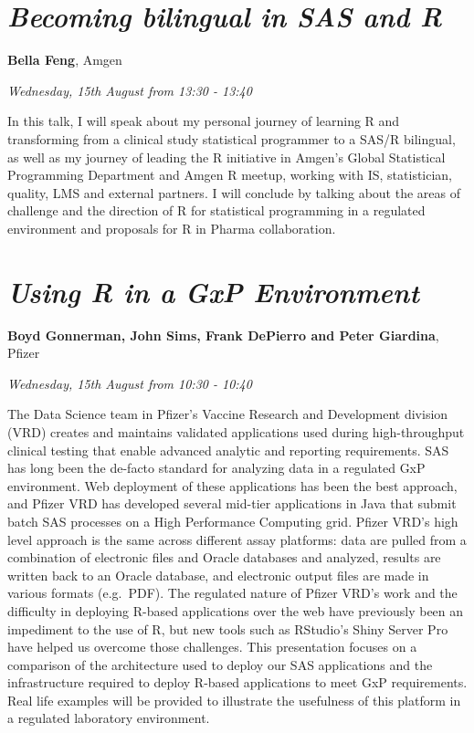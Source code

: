 \documentclass[]{book}
\theoremstyle{definition}
\theoremstyle{definition}
\theoremstyle{definition}
\theoremstyle{remark}
\begin{document}
\hypertarget{becoming-bilingual-in-sas-and-r}{%
\section{\texorpdfstring{\emph{Becoming bilingual in SAS and
R}}{Becoming bilingual in SAS and R}}\label{becoming-bilingual-in-sas-and-r}}

\textbf{Bella Feng}, Amgen

\emph{Wednesday, 15th August from 13:30 - 13:40}

In this talk, I will speak about my personal journey of learning R and
transforming from a clinical study statistical programmer to a SAS/R
bilingual, as well as my journey of leading the R initiative in Amgen's
Global Statistical Programming Department and Amgen R meetup, working
with IS, statistician, quality, LMS and external partners. I will
conclude by talking about the areas of challenge and the direction of R
for statistical programming in a regulated environment and proposals for
R in Pharma collaboration.

\hypertarget{using-r-in-a-gxp-environment}{%
\section{\texorpdfstring{\emph{Using R in a GxP
Environment}}{Using R in a GxP Environment}}\label{using-r-in-a-gxp-environment}}

\textbf{Boyd Gonnerman, John Sims, Frank DePierro and Peter Giardina},
Pfizer

\emph{Wednesday, 15th August from 10:30 - 10:40}

The Data Science team in Pfizer's Vaccine Research and Development
division (VRD) creates and maintains validated applications used during
high-throughput clinical testing that enable advanced analytic and
reporting requirements. SAS has long been the de-facto standard for
analyzing data in a regulated GxP environment. Web deployment of these
applications has been the best approach, and Pfizer VRD has developed
several mid-tier applications in Java that submit batch SAS processes on
a High Performance Computing grid. Pfizer VRD's high level approach is
the same across different assay platforms: data are pulled from a
combination of electronic files and Oracle databases and analyzed,
results are written back to an Oracle database, and electronic output
files are made in various formats (e.g.~PDF). The regulated nature of
Pfizer VRD's work and the difficulty in deploying R-based applications
over the web have previously been an impediment to the use of R, but new
tools such as RStudio's Shiny Server Pro have helped us overcome those
challenges. This presentation focuses on a comparison of the
architecture used to deploy our SAS applications and the infrastructure
required to deploy R-based applications to meet GxP requirements. Real
life examples will be provided to illustrate the usefulness of this
platform in a regulated laboratory environment.
\end{document}
